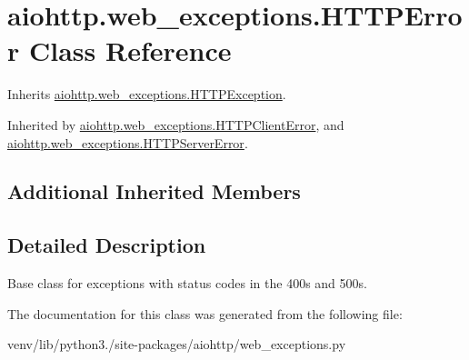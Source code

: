 \hypertarget{classaiohttp_1_1web__exceptions_1_1_h_t_t_p_error}{}\section{aiohttp.\+web\+\_\+exceptions.\+H\+T\+T\+P\+Error Class Reference}
\label{classaiohttp_1_1web__exceptions_1_1_h_t_t_p_error}


Inherits \hyperlink{classaiohttp_1_1web__exceptions_1_1_h_t_t_p_exception}{aiohttp.\+web\+\_\+exceptions.\+H\+T\+T\+P\+Exception}.



Inherited by \hyperlink{classaiohttp_1_1web__exceptions_1_1_h_t_t_p_client_error}{aiohttp.\+web\+\_\+exceptions.\+H\+T\+T\+P\+Client\+Error}, and \hyperlink{classaiohttp_1_1web__exceptions_1_1_h_t_t_p_server_error}{aiohttp.\+web\+\_\+exceptions.\+H\+T\+T\+P\+Server\+Error}.

\subsection*{Additional Inherited Members}


\subsection{Detailed Description}
\begin{DoxyVerb}Base class for exceptions with status codes in the 400s and 500s.\end{DoxyVerb}
 

The documentation for this class was generated from the following file\+:\begin{DoxyCompactItemize}
\item 
venv/lib/python3./site-\/packages/aiohttp/web\+\_\+exceptions.\+py\end{DoxyCompactItemize}
